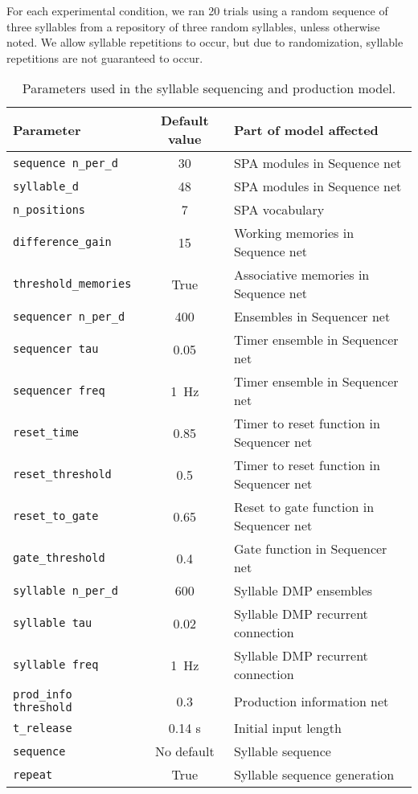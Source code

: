 For each experimental condition,
we ran 20 trials using
a random sequence of three syllables
from a repository of three random syllables,
unless otherwise noted.
We allow syllable repetitions to occur,
but due to randomization,
syllable repetitions are not guaranteed to occur.

\begin{table}[ht!]
  \begin{footnotesize}
    \begin{center}
      \begin{tabular}{lcl}
        \toprule
        Parameter & Default value & Part of model affected \\
        \midrule
        \texttt{sequence n\_per\_d} & 30 & SPA modules in Sequence net \\
        \texttt{syllable\_d} & 48 & SPA modules in Sequence net \\
        \texttt{n\_positions} & 7 & SPA vocabulary \\
        \texttt{difference\_gain} & 15 & Working memories in Sequence net \\
        \texttt{threshold\_memories} & True
          & Associative memories in Sequence net \\
        \texttt{sequencer n\_per\_d} & 400 & Ensembles in Sequencer net \\
        \texttt{sequencer tau} & 0.05 & Timer ensemble in Sequencer net \\
        \texttt{sequencer freq} & 1~Hz & Timer ensemble in Sequencer net \\
        \texttt{reset\_time} & 0.85
          & Timer to reset function in Sequencer net \\
        \texttt{reset\_threshold} & 0.5
          & Timer to reset function in Sequencer net \\
        \texttt{reset\_to\_gate} & 0.65
          & Reset to gate function in Sequencer net \\
        \texttt{gate\_threshold} & 0.4 & Gate function in Sequencer net \\
        \texttt{syllable n\_per\_d} & 600 & Syllable DMP ensembles \\
        \texttt{syllable tau} & 0.02 & Syllable DMP recurrent connection \\
        \texttt{syllable freq} & 1~Hz & Syllable DMP recurrent connection \\
        \texttt{prod\_info threshold} & 0.3 & Production information net \\
        \texttt{t\_release} & 0.14 s & Initial input length \\
        \texttt{sequence} & No default & Syllable sequence \\
        \texttt{repeat} & True & Syllable sequence generation \\
        \bottomrule
      \end{tabular}
    \end{center}
  \end{footnotesize}
  \caption{Parameters used in the syllable sequencing and production model.}
\label{tab:prod}
\end{table}

